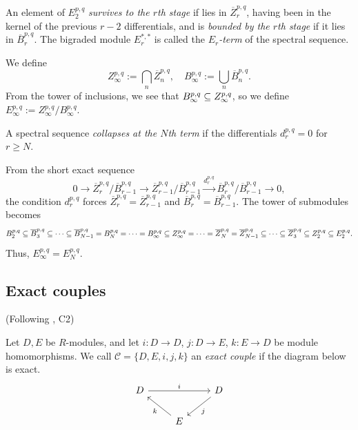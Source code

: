 \documentclass{MetricNotes2023}
\def\subq{\ensuremath\subseteq}
\begin{document}
\begin{definition}
An element of \(E_2^{p,q}\) \textit{survives to the \(r\)th stage} if lies in \(\overline{Z}_r^{p,q}\), having been in the kernel of the previous \(r-2\) differentials, and is \textit{bounded by the \(r\)th stage} if it lies in \(\overline{B}_r^{p,q}\). The bigraded module \(E_r^{*,*}\) is called the \textit{\(E_r\)-term} of the spectral sequence. 
\end{definition}

We define 
\[Z_\infty^{p,q}:= \bigcap_n \overline{Z}^{p,q}_n, \quad B_\infty^{p,q}:=\bigcup_n \overline{B}^{p,q}_n.\]
From the tower of inclusions, we see that \(B_\infty^{p,q}\subq Z^{p,q}_\infty\), so we define \(E_\infty^{p,q}:=Z_\infty^{p,q}/B_\infty^{p,q}\). 

\begin{definition}
A spectral sequence \textit{collapses at the \(N\)th term} if the differentials \(d_r^{p,q}=0\) for \(r\geq N\). 
\end{definition}

From the short exact sequence 
\[0 \to \overline Z^{p,q}_{r}/\overline B_{r-1}^{p,q}\to \overline Z_{r-1}^{p,q}/\overline B_{r-1}^{p,q} \xrightarrow{d_{r}^{p,q}} \overline B_{r}^{p,q}/\overline{B}_{r-1}^{p,q}\to 0,\]
the condition \(d_r^{p,q}\) forces  \(\overline{Z}^{p,q}_r=\overline{Z}_{r-1}^{p,q}\) and \(\overline{B}^{p,q}_r=\overline{B}_{r-1}^{p,q}\). The tower of submodules becomes
\[B_2^{p,q}\subq \overline B_3^{p,q}\subq \cdots \subq \overline B_{N-1}^{p,q}=B_N^{p,q}= \cdots=B_\infty^{p,q} \subq Z_\infty^{p,q}= \cdots = \overline Z_N^{p,q}=\overline Z^{p,q}_{N-1}\subq \cdots \subq \overline Z_3^{p,q}\subq Z_2^{p,q}\subq E_2^{p,q}.\]
Thus, \(E_\infty^{p,q}=E_N^{p,q}\). 

\subsection{Exact couples}\label{2503301333}

(Following \autocite{spectral_sequences}, C2)

\begin{definition}
Let \(D, E\) be \(R\)-modules, and let \(i : D \to D\), \(j : D\to E\), \(k : E \to D\) be module homomorphisms. We call \(\mathcal{C}=\{D, E, i, j, k\}\) an \textit{exact couple} if the diagram below is exact.
\[\begin{tikzcd}
 D \arrow[rr, "i"] && D \arrow[dl, "j"] \\ 
  & E \arrow[ul, "k"] &  
 \end{tikzcd}\] 
\end{definition}
\end{document}

